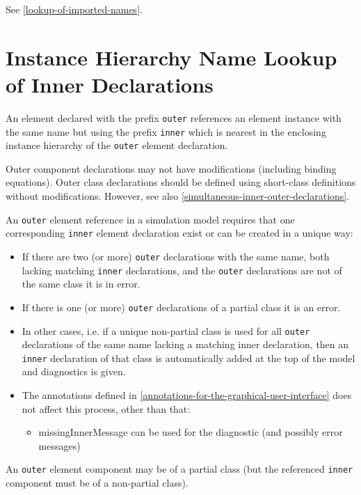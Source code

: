 See \autoref{lookup-of-imported-names}.

\section{Instance Hierarchy Name Lookup of Inner Declarations}

An element declared with the prefix \lstinline!outer! references an element instance
with the same name but using the prefix \lstinline!inner! which is nearest in the
enclosing instance hierarchy of the \lstinline!outer! element declaration.

Outer component declarations may not have modifications (including binding equations).
Outer class declarations should be defined using short-class
definitions without modifications. However, see also \autoref{simultaneous-inner-outer-declarations}.

An \lstinline!outer! element reference in a simulation model requires that one
corresponding \lstinline!inner! element declaration exist or can be created in a
unique way:
\begin{itemize}
\item
  If there are two (or more) \lstinline!outer! declarations with the same name, both
  lacking matching \lstinline!inner! declarations, and the \lstinline!outer! declarations are
  not of the same class it is in error.
\item
  If there is one (or more) \lstinline!outer! declarations of a partial class it is
  an error.
\item
  In other cases, i.e. if a unique non-partial class is used for all
  \lstinline!outer! declarations of the same name lacking a matching inner
  declaration, then an \lstinline!inner! declaration of that class is automatically
  added at the top of the model and diagnostics is given.
\item
  The annotations defined in \autoref{annotations-for-the-graphical-user-interface} does not affect this process,
  other than that:

  \begin{itemize}
  \item
    missingInnerMessage can be used for the diagnostic (and possibly
    error messages)
  \end{itemize}
\end{itemize}

An \lstinline!outer! element component may be of a partial class (but the
referenced \lstinline!inner! component must be of a non-partial class).

